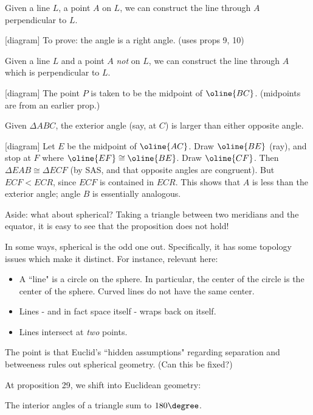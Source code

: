 \documentclass{article}
\begin{document}
\begin{lm}[title=Prop. 11]
    Given a line $ L $, a point $ A $ on $ L $, we can construct the line through $ A $
    perpendicular to $ L $.
\end{lm}
[diagram] To prove: the angle is a right angle. (uses props 9, 10)

\begin{lm}[title=Prop. 12]
    Given a line $ L $ and a point $ A $ \textit{not} on $ L $, we can construct the line
    through $ A $ which is perpendicular to $ L $.
\end{lm}
[diagram] The point $ P $ is taken to be the midpoint of $ \oline{BC} $. (midpoints are from an
earlier prop.)

\begin{lm}[title=Prop. 16]
    Given $ \Delta ABC $, the exterior angle (say, at $ C $) is larger than either opposite angle.
\end{lm}
[diagram]
Let $ E $ be the midpoint of $ \oline{AC} $.
Draw $ \oline{BE} $ (ray), and stop at $ F $ where $ \oline{EF} \cong \oline{BE} $.
Draw $ \oline{CF} $. Then $ \Delta EAB \cong \Delta ECF $ (by SAS, and that opposite angles are
congruent).
But $ ECF < ECR $, since $ ECF $ is contained in $ ECR $. This shows that $ A $ is less than the
exterior angle; angle $ B $ is essentially analogous.

Aside: what about spherical? Taking a triangle between two meridians and the equator, it is easy
to see that the proposition does not hold!

In some ways, spherical is the odd one out. Specifically, it has some topology issues which make it
distinct. For instance, relevant here:
\begin{itemize}
    \item A ``line" is a circle on the sphere. In particular, the center of the circle is the
        center of the sphere. Curved lines do not have the same center.
    \item Lines - and in fact space itself - wraps back on itself.
    \item Lines intersect at \textit{two} points.
\end{itemize}
The point is that Euclid's ``hidden assumptions" regarding separation and betweeness rules out
spherical geometry. (Can this be fixed?)


At proposition 29, we shift into Euclidean geometry:
\begin{lm}[title=Prop. 29]
    The interior angles of a triangle sum to $ 180 \degree $.
\end{lm}
\end{document}
